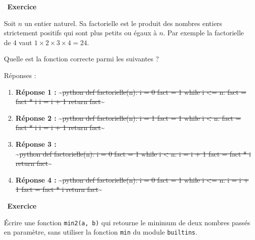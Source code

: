 \documentclass[
  11pt,
]{article}
\newcommand{\passthrough}[1]{#1}
\newcounter{exo}
\newenvironment{exercice}[1]
{\par \medskip   \addtocounter{exo}{1} \noindent  
\begin{bclogo}[arrondi =0.1,   noborder = true, logo=\bccrayon, marge=4]{~\textbf{Exercice} \textbf{\theexo} {\itshape #1} }  \par}
{
\end{bclogo}
 \par \bigskip }
\newcounter{def}
\begin{document}
\begin{exercice}{}

Soit \(n\) un entier naturel. Sa factorielle est le produit des nombres
entiers strictement positifs qui sont plus petits ou égaux à \(n\). Par
exemple la factorielle de 4 vaut \(1 \times 2 \times 3 \times 4 = 24\).

Quelle est la fonction correcte parmi les suivantes ?

Réponses :

\begin{enumerate}
\def\labelenumi{\arabic{enumi}.}
\item
  \textbf{Réponse 1 :} \textasciitilde{}\sout{python def factorielle(n):
  i = 0 fact = 1 while i \textless= n: fact = fact * i i = i + 1 return
  fact}\textasciitilde{}
\item
  \textbf{Réponse 2 :} \textasciitilde{}\sout{python def factorielle(n):
  i = 1 fact = 1 while i \textless{} n: fact = fact * i i = i + 1 return
  fact}\textasciitilde{}
\item
  \textbf{Réponse 3 :}\\
  \textasciitilde{}\sout{python def factorielle(n): i = 0 fact = 1 while
  i \textless{} n: i = i + 1 fact = fact * i return
  fact}\textasciitilde{}
\item
  \textbf{Réponse 4 :} \textasciitilde{}\sout{python def factorielle(n):
  i = 0 fact = 1 while i \textless= n: i = i + 1 fact = fact * i return
  fact}\textasciitilde{}
\end{enumerate}

\end{exercice}

\begin{exercice}{}

Écrire une fonction \passthrough{\lstinline!min2(a, b)!} qui retourne le
minimum de deux nombres passés en paramètre, sans utiliser la fonction
\passthrough{\lstinline!min!} du module
\passthrough{\lstinline!builtins!}.

\end{exercice}
\end{document}
